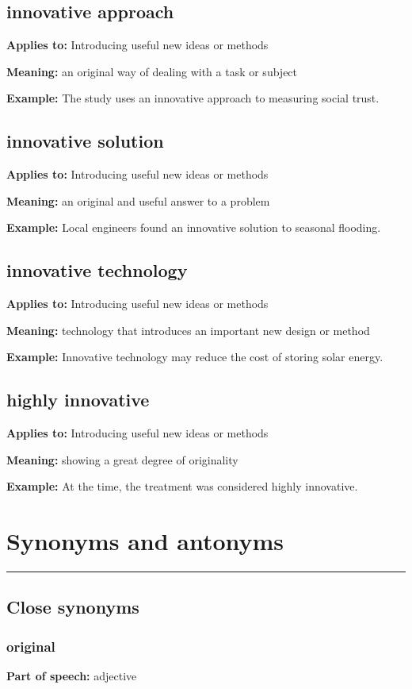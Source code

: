 \documentclass[11pt]{article}
\newcommand{\sectionrule}{\par\vspace{-0.5em}\noindent\textcolor{Accent}{\rule{\linewidth}{0.6pt}}\par}
\begin{document}
\subsection{innovative approach}
\textbf{Applies to:} Introducing useful new ideas or methods

\textbf{Meaning:} an original way of dealing with a task or subject

\textbf{Example:} The study uses an innovative approach to measuring social trust.

\subsection{innovative solution}
\textbf{Applies to:} Introducing useful new ideas or methods

\textbf{Meaning:} an original and useful answer to a problem

\textbf{Example:} Local engineers found an innovative solution to seasonal flooding.

\subsection{innovative technology}
\textbf{Applies to:} Introducing useful new ideas or methods

\textbf{Meaning:} technology that introduces an important new design or method

\textbf{Example:} Innovative technology may reduce the cost of storing solar energy.

\subsection{highly innovative}
\textbf{Applies to:} Introducing useful new ideas or methods

\textbf{Meaning:} showing a great degree of originality

\textbf{Example:} At the time, the treatment was considered highly innovative.

\section{Synonyms and antonyms}
\sectionrule
\subsection{Close synonyms}
\subsubsection{original}
\textbf{Part of speech:} adjective
\end{document}
